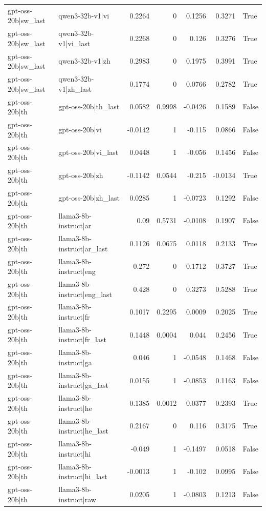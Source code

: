 \begin{table}
\begin{tabular}{l l r r r r l}
gpt-oss-20b|sw_last & qwen3-32b-v1|vi & 0.2264 & 0 & 0.1256 & 0.3271 & True \\
gpt-oss-20b|sw_last & qwen3-32b-v1|vi_last & 0.2268 & 0 & 0.126 & 0.3276 & True \\
gpt-oss-20b|sw_last & qwen3-32b-v1|zh & 0.2983 & 0 & 0.1975 & 0.3991 & True \\
gpt-oss-20b|sw_last & qwen3-32b-v1|zh_last & 0.1774 & 0 & 0.0766 & 0.2782 & True \\
gpt-oss-20b|th & gpt-oss-20b|th_last & 0.0582 & 0.9998 & -0.0426 & 0.1589 & False \\
gpt-oss-20b|th & gpt-oss-20b|vi & -0.0142 & 1 & -0.115 & 0.0866 & False \\
gpt-oss-20b|th & gpt-oss-20b|vi_last & 0.0448 & 1 & -0.056 & 0.1456 & False \\
gpt-oss-20b|th & gpt-oss-20b|zh & -0.1142 & 0.0544 & -0.215 & -0.0134 & True \\
gpt-oss-20b|th & gpt-oss-20b|zh_last & 0.0285 & 1 & -0.0723 & 0.1292 & False \\
gpt-oss-20b|th & llama3-8b-instruct|ar & 0.09 & 0.5731 & -0.0108 & 0.1907 & False \\
gpt-oss-20b|th & llama3-8b-instruct|ar_last & 0.1126 & 0.0675 & 0.0118 & 0.2133 & True \\
gpt-oss-20b|th & llama3-8b-instruct|eng & 0.272 & 0 & 0.1712 & 0.3727 & True \\
gpt-oss-20b|th & llama3-8b-instruct|eng_last & 0.428 & 0 & 0.3273 & 0.5288 & True \\
gpt-oss-20b|th & llama3-8b-instruct|fr & 0.1017 & 0.2295 & 0.0009 & 0.2025 & True \\
gpt-oss-20b|th & llama3-8b-instruct|fr_last & 0.1448 & 0.0004 & 0.044 & 0.2456 & True \\
gpt-oss-20b|th & llama3-8b-instruct|ga & 0.046 & 1 & -0.0548 & 0.1468 & False \\
gpt-oss-20b|th & llama3-8b-instruct|ga_last & 0.0155 & 1 & -0.0853 & 0.1163 & False \\
gpt-oss-20b|th & llama3-8b-instruct|he & 0.1385 & 0.0012 & 0.0377 & 0.2393 & True \\
gpt-oss-20b|th & llama3-8b-instruct|he_last & 0.2167 & 0 & 0.116 & 0.3175 & True \\
gpt-oss-20b|th & llama3-8b-instruct|hi & -0.049 & 1 & -0.1497 & 0.0518 & False \\
gpt-oss-20b|th & llama3-8b-instruct|hi_last & -0.0013 & 1 & -0.102 & 0.0995 & False \\
gpt-oss-20b|th & llama3-8b-instruct|raw & 0.0205 & 1 & -0.0803 & 0.1213 & False \\

\end{tabular}
\end{table}
